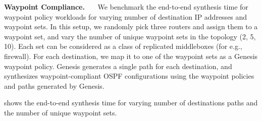 \noindent\textbf{Waypoint Compliance.}~~~
We benchmark the end-to-end synthesis time for waypoint policy 
workloads for varying number of destination IP addresses and 
waypoint sets. In this setup, we randomly pick three routers
and assign them to a waypoint set, and vary the number of 
unique waypoint sets in the topology (2, 5, 10). Each set can be 
considered as a class of replicated middleboxes (for e.g., firewall).
For each destination, we map it to one of the waypoint sets as a
Genesis waypoint policy. Genesis generates a single path for each 
destination, and \name synthesizes waypoint-compliant OSPF 
configurations using the waypoint policies and paths generated by Genesis.  

 shows the end-to-end synthesis
 time for varying number of destinations paths and the 
 number of unique waypoint sets.  




